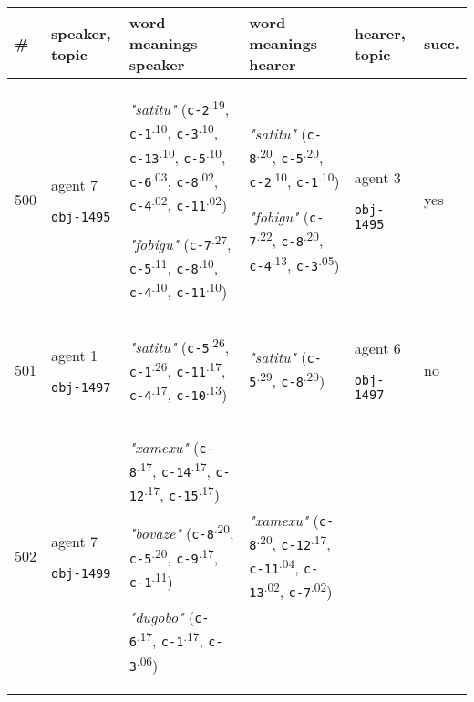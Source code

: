 
\renewcommand{\arraystretch}{1.25}{
  \begin{tabular}{@{}p{0.3cm}p{0.9cm}p{6cm}p{6cm}p{0.9cm}p{0.55cm}@{}}
  \# & speaker, topic & word meanings speaker & word meanings hearer & hearer, topic & succ. \\
  \hline

500 & agent 7 

\texttt{obj-1495} &\textit{"satitu"} (\texttt{c-2}\textsuperscript{.19}, \texttt{c-1}\textsuperscript{.10}, \texttt{c-3}\textsuperscript{.10}, \texttt{c-13}\textsuperscript{.10}, \texttt{c-5}\textsuperscript{.10}, \texttt{c-6}\textsuperscript{.03}, \texttt{c-8}\textsuperscript{.02}, \texttt{c-4}\textsuperscript{.02}, \texttt{c-11}\textsuperscript{.02})

\textit{"fobigu"} (\texttt{c-7}\textsuperscript{.27}, \texttt{c-5}\textsuperscript{.11}, \texttt{c-8}\textsuperscript{.10}, \texttt{c-4}\textsuperscript{.10}, \texttt{c-11}\textsuperscript{.10}) & \textit{"satitu"} (\texttt{c-8}\textsuperscript{.20}, \texttt{c-5}\textsuperscript{.20}, \texttt{c-2}\textsuperscript{.10}, \texttt{c-1}\textsuperscript{.10})

\textit{"fobigu"} (\texttt{c-7}\textsuperscript{.22}, \texttt{c-8}\textsuperscript{.20}, \texttt{c-4}\textsuperscript{.13}, \texttt{c-3}\textsuperscript{.05}) & agent 3 

 \texttt{obj-1495} & yes \\
501 & agent 1 

\texttt{obj-1497} &\textit{"satitu"} (\texttt{c-5}\textsuperscript{.26}, \texttt{c-1}\textsuperscript{.26}, \texttt{c-11}\textsuperscript{.17}, \texttt{c-4}\textsuperscript{.17}, \texttt{c-10}\textsuperscript{.13}) & \textit{"satitu"} (\texttt{c-5}\textsuperscript{.29}, \texttt{c-8}\textsuperscript{.20}) & agent 6 

 \texttt{obj-1497} & no \\
502 & agent 7 

\texttt{obj-1499} &\textit{"xamexu"} (\texttt{c-8}\textsuperscript{.17}, \texttt{c-14}\textsuperscript{.17}, \texttt{c-12}\textsuperscript{.17}, \texttt{c-15}\textsuperscript{.17})

\textit{"bovaze"} (\texttt{c-8}\textsuperscript{.20}, \texttt{c-5}\textsuperscript{.20}, \texttt{c-9}\textsuperscript{.17}, \texttt{c-1}\textsuperscript{.11})

\textit{"dugobo"} (\texttt{c-6}\textsuperscript{.17}, \texttt{c-1}\textsuperscript{.17}, \texttt{c-3}\textsuperscript{.06}) & \textit{"xamexu"} (\texttt{c-8}\textsuperscript{.20}, \texttt{c-12}\textsuperscript{.17}, \texttt{c-11}\textsuperscript{.04}, \texttt{c-13}\textsuperscript{.02}, \texttt{c-7}\textsuperscript{.02})


\end{tabular}}

